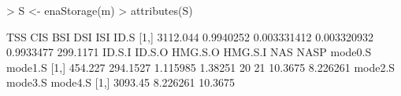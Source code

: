 \documentclass[11pt]{article}
\begin{document}
\begin{Schunk}
\begin{Sinput}
>   S <- enaStorage(m)
> attributes(S)
\end{Sinput}
\begin{Soutput}
          TSS       CIS         BSI         DSI       ISI     ID.S
[1,] 3112.044 0.9940252 0.003331412 0.003320932 0.9933477 299.1171
      ID.S.I   ID.S.O  HMG.S.O HMG.S.I NAS NASP mode0.S  mode1.S
[1,] 454.227 294.1527 1.115985 1.38251  20   21 10.3675 8.226261
     mode2.S  mode3.S mode4.S
[1,] 3093.45 8.226261 10.3675
\end{Soutput}
\end{Schunk}
\end{document}
